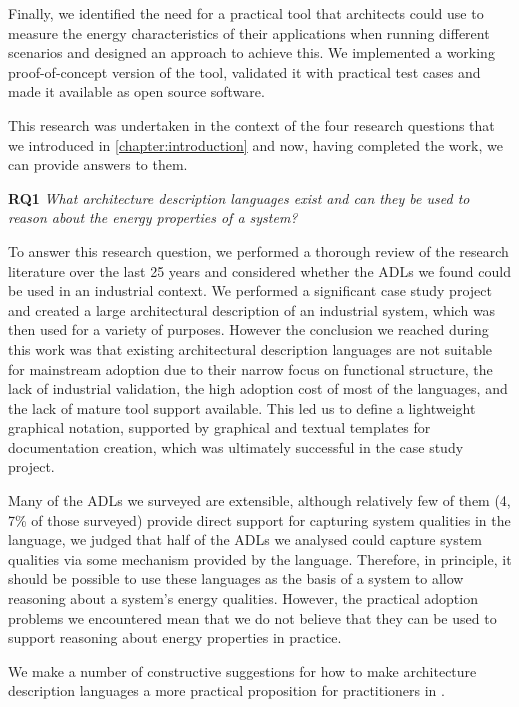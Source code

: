 Finally, we identified the need for a practical tool that architects could use to measure the energy characteristics of their applications when running different scenarios and designed an approach to achieve this.  We implemented a working proof-of-concept version of the tool, validated it with practical test cases and made it available as open source software.

This research was undertaken in the context of the four research questions that we introduced in \cref{chapter:introduction} and now, having completed the work, we can provide answers to them.

\textbf{RQ1} \emph{What architecture description languages exist and can they be used to reason about the energy properties of a system?}

To answer this research question, we performed a thorough review of the research literature over the last 25 years and considered whether the ADLs we found could be used in an industrial context.  We performed a significant case study project and created a large architectural description of an industrial system, which was then used for a variety of purposes.  However the conclusion we reached during this work was that existing architectural description languages are not suitable for mainstream adoption due to their narrow focus on functional structure, the lack of industrial validation, the high adoption cost of most of the languages, and the lack of mature tool support available.  This led us to define a lightweight graphical notation, supported by graphical and textual templates for documentation creation, which was ultimately successful in the case study project.

Many of the ADLs we surveyed are extensible, although relatively few of them (4, 7\% of those surveyed) provide direct support for capturing system qualities in the language, we judged that half of the ADLs we analysed could capture system qualities via some mechanism provided by the language.  Therefore, in principle, it should be possible to use these languages as the basis of a system to allow reasoning about a system's energy qualities.  However, the practical adoption problems we encountered mean that we do not believe that they can be used to support reasoning about energy properties in practice.

We make a number of constructive suggestions for how to make architecture description languages a more practical proposition for practitioners in
 .

